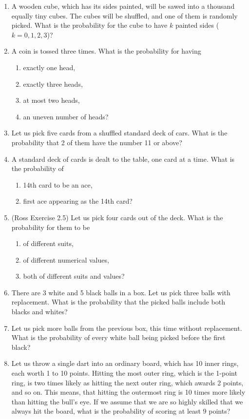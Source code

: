 \documentclass[12pt,a4paper,leqno]{report}
\theoremstyle{plain}
\theoremstyle{definition}
\begin{document}
\begin{enumerate}
\item A wooden cube, which has its sides painted, will be sawed into a thousand equally tiny cubes. The cubes will be shuffled, and one of them is randomly picked. What is the probability for the cube to have $k$ painted sides ($k = 0,1,2,3$)?
\item A coin is tossed three times. What is the probability for having
\begin{enumerate}
\item exactly one head, 
\item exactly three heads,
\item at most two heads,
\item an uneven number of heads?
\end{enumerate}
\item Let us pick five cards from a shuffled standard deck of cars. What is the probability that 2 of them have the number 11 or above?
\item A standard deck of cards is dealt to the table, one card at a time. What is the probability of
\begin{enumerate}
\item 14th card to be an ace,
\item first ace appearing as the 14th card?
\end{enumerate}
\item (Ross Exercise 2.5) Let us pick four cards out of the deck. What is the probability for them to be
\begin{enumerate}
\item of different suits,
\item of different numerical values,
\item both of different suits and values?
\end{enumerate}
\item There are 3 white and 5 black balls in a box. Let us pick three balls with replacement. What is the probability that the picked balls include both blacks and whites?
\item Let us pick more balls from the previous box, this time without replacement. What is the probability of every white ball being picked before the first black?
\item Let us throw a single dart into an ordinary board, which has 10 inner rings, each worth 1 to 10 points. Hitting the most outer ring, which is the 1-point ring, is two times likely as hitting the next outer ring, which awards 2 points, and so on. This means, that hitting the outermost ring is 10 times more likely than hitting the bull's eye. If we assume that we are so highly skilled that we always hit the board, what is the probability of scoring at least 9 points?

\end{enumerate}
\end{document}
